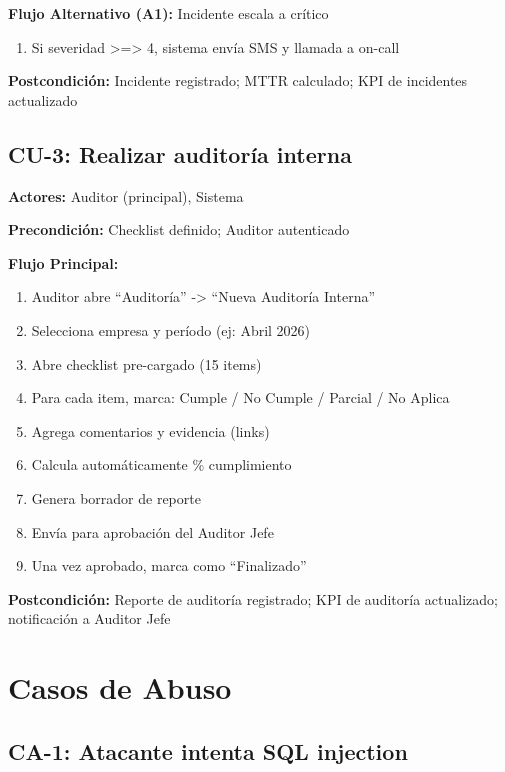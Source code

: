 \documentclass[12pt,a4paper,oneside]{article}
\begin{document}
\textbf{Flujo Alternativo (A1):} Incidente escala a crítico
\begin{enumerate}
  \item Si severidad \textgreater{}=\textgreater{} 4, sistema envía SMS y llamada a on-call
\end{enumerate}

\textbf{Postcondición:} Incidente registrado; MTTR calculado; KPI de incidentes actualizado

\subsection{CU-3: Realizar auditoría interna}

\textbf{Actores:} Auditor (principal), Sistema

\textbf{Precondición:} Checklist definido; Auditor autenticado

\textbf{Flujo Principal:}
\begin{enumerate}
  \item Auditor abre ``Auditoría'' -> ``Nueva Auditoría Interna''
  \item Selecciona empresa y período (ej: Abril 2026)
  \item Abre checklist pre-cargado (15 items)
  \item Para cada item, marca: Cumple / No Cumple / Parcial / No Aplica
  \item Agrega comentarios y evidencia (links)
  \item Calcula automáticamente \% cumplimiento
  \item Genera borrador de reporte
  \item Envía para aprobación del Auditor Jefe
  \item Una vez aprobado, marca como ``Finalizado''
\end{enumerate}

\textbf{Postcondición:} Reporte de auditoría registrado; KPI de auditoría actualizado; notificación a Auditor Jefe

\section{Casos de Abuso}

\subsection{CA-1: Atacante intenta SQL injection}
\end{document}
